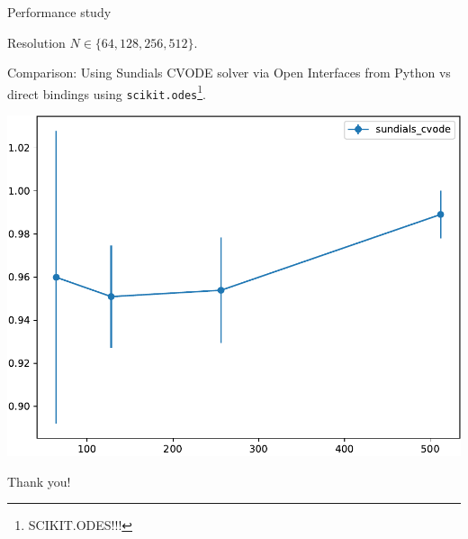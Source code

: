 \documentclass[10pt, aspectratio=169, progressbar=frametitle]{beamer}
\begin{document}
\begin{frame}{Performance study}

  \begin{minipage}{\dimexpr0.5\textwidth - 2\tabcolsep}
  Resolution $N \in \{64, 128, 256, 512\}$.

  Comparison: Using Sundials CVODE solver via Open Interfaces from Python
  vs direct bindings using \texttt{scikit.odes}\footnote{SCIKIT.ODES!!!}.
  \end{minipage}%
  \begin{minipage}{\dimexpr0.5\textwidth - 2\tabcolsep}
  \centering
  \includegraphics[scale=0.45]{ivp_cvode_gs_perf_normalized}
  \end{minipage}
\end{frame}

\begin{frame}[standout]{}
  \centering
  \huge{Thank you!}
\end{frame}
\end{document}
